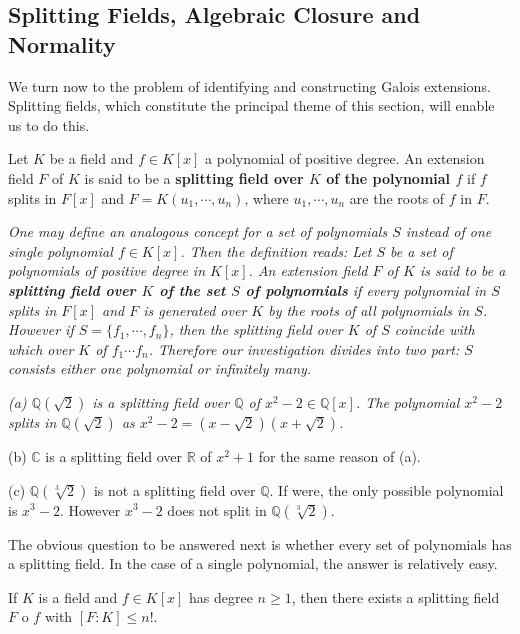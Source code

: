 \subsection{Splitting Fields, Algebraic Closure and Normality}
We turn now to the problem of identifying and constructing Galois extensions. Splitting fields, which constitute the principal theme of this section, will enable us to do this.
\begin{definition}
Let $K$ be a field and $f\in K[x]$ a polynomial of positive degree. An extension field $F$ of $K$ is said to be a \textbf{splitting field over $K$ of the polynomial $f$} if $f$ splits in $F[x]$ and $F=K(u_1,\cdots,u_n)$, where $u_1,\cdots,u_n$ are the roots of $f$ in $F$.
\end{definition}
\begin{note}\em
One may define an analogous concept for a set of polynomials $S$ instead of one single polynomial $f\in K[x]$. Then the definition reads: Let $S$ be a set of polynomials of positive degree in $K[x]$. An extension field $F$ of $K$ is said to be a \textbf{splitting field over $K$ of the set $S$ of polynomials} if every polynomial in $S$ splits in $F[x]$ and $F$ is generated over $K$ by the roots of all polynomials in $S$. However if $S=\{f_1,\cdots,f_n\}$, then the splitting field over $K$ of $S$ coincide with which over $K$ of $f_1\cdots f_n$. Therefore our investigation divides into two part: $S$ consists either one polynomial or infinitely many.
\end{note}
\begin{example}\em
(a) $\mathbb{Q}(\sqrt{2})$ is a splitting field over $\mathbb{Q}$ of $x^2-2\in\mathbb{Q}[x]$. The polynomial $x^2-2$ splits in $\mathbb{Q}(\sqrt{2})$ as $x^2-2=(x-\sqrt{2})(x+\sqrt{2})$.\par
(b) $\mathbb{C}$ is a splitting field over $\mathbb{R}$ of $x^2+1$ for the same reason of (a).\par
(c) $\mathbb{Q}(\sqrt[3]{2})$ is not a splitting field over $\mathbb{Q}$. If were, the only possible polynomial is $x^3-2$. However $x^3-2$ does not split in $\mathbb{Q}(\sqrt[3]{2})$.
\end{example}
The obvious question to be answered next is whether every set of polynomials has a splitting field. In the case of a single polynomial, the answer is relatively easy.
\begin{theorem}
If $K$ is a field and $f\in K[x]$ has degree $n\ge 1$, then there exists a splitting field $F$ o $f$ with $[F:K]\le n!$.
\end{theorem}
